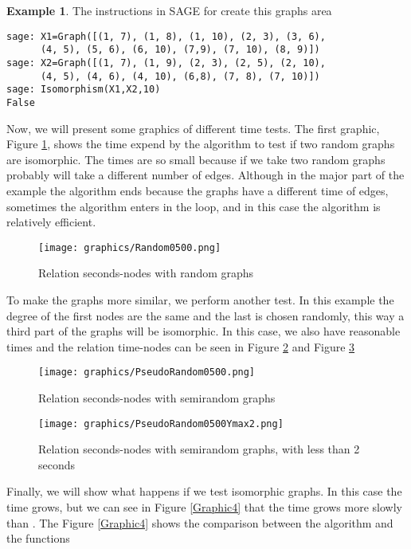 \documentclass[12pt,a4paper]{book}
\theoremstyle{plain}
\theoremstyle{definition}
\newtheorem{example}{Example}
\theoremstyle{remark}
\begin{document}
\begin{center}
\begin{example}
The instructions in SAGE for create this graphs area
\begin{verbatim}
sage: X1=Graph([(1, 7), (1, 8), (1, 10), (2, 3), (3, 6),
      (4, 5), (5, 6), (6, 10), (7,9), (7, 10), (8, 9)])
sage: X2=Graph([(1, 7), (1, 9), (2, 3), (2, 5), (2, 10), 
      (4, 5), (4, 6), (4, 10), (6,8), (7, 8), (7, 10)])
sage: Isomorphism(X1,X2,10)
False  
\end{verbatim}

\end{example}

Now,  we will present some graphics of different time tests. The first graphic, Figure \ref{Graphic1}, shows the time expend by the 
algorithm to test if two random graphs are isomorphic. The times are so small because if we take two random graphs probably will 
take a different number of edges. Although in the major part of the example the algorithm ends because the graphs have a different 
time of edges, sometimes the algorithm enters in the loop, and in this case the algorithm is relatively efficient.
\begin{figure}
\centering
\texttt{[image: graphics/Random0500.png]}
\caption{Relation seconds-nodes with random graphs}\label{Graphic1}
\end{figure}

To make the graphs more similar, we perform another test. In this example the degree of the first  nodes are the same and the last is 
chosen randomly, this way a third part of the graphs will be isomorphic. In this case,  we also have reasonable times and  the relation 
time-nodes can be seen in Figure \ref{Graphic2} and Figure \ref{Graphic3}

\begin{figure}
\centering
\texttt{[image: graphics/PseudoRandom0500.png]}
\caption{Relation seconds-nodes with semirandom graphs}\label{Graphic2}
\end{figure}


\begin{figure}
\centering
\texttt{[image: graphics/PseudoRandom0500Ymax2.png]}
\caption{Relation seconds-nodes with semirandom graphs, with less than 2 seconds}\label{Graphic3}
\end{figure}

Finally, we will  show what happens if we test isomorphic graphs. In this case the time grows, but we can see in Figure \ref{Graphic4} 
that the time grows more slowly than . The Figure \ref{Graphic4} shows the comparison between the algorithm and the 
functions 


\end{center}
\end{document}
